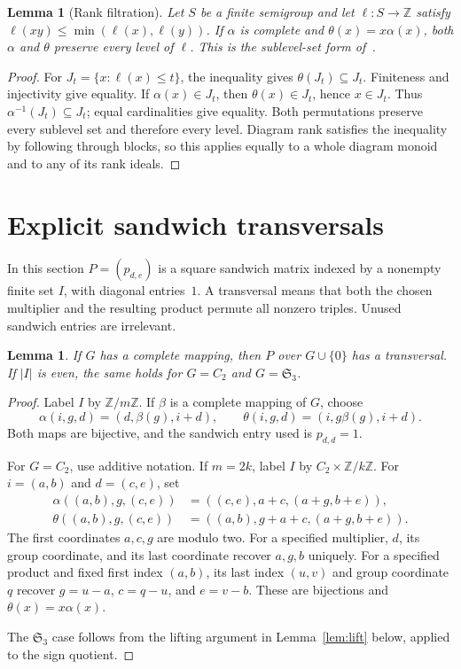\documentclass[11pt,a4paper]{article}
\newtheorem{lemma}[theorem]{Lemma}
\newcommand{\Sym}{\mathfrak S}
\newcommand{\Z}{\mathbb Z}
\begin{document}
\begin{lemma}[Rank filtration]\label{lem:filtration}
Let $S$ be a finite semigroup and let $\ell:S\to\mathbb Z$ satisfy $\ell(xy)\le\min(\ell(x),\ell(y))$. If $\alpha$ is complete and $\theta(x)=x\alpha(x)$, both $\alpha$ and $\theta$ preserve every level of $\ell$. This is the sublevel-set form of~\cite[Proposition~3.1]{ABCHK}.
\end{lemma}
\begin{proof}
For $J_t=\{x:\ell(x)\le t\}$, the inequality gives $\theta(J_t)\subseteq J_t$. Finiteness and injectivity give equality. If $\alpha(x)\in J_t$, then $\theta(x)\in J_t$, hence $x\in J_t$. Thus $\alpha^{-1}(J_t)\subseteq J_t$; equal cardinalities give equality. Both permutations preserve every sublevel set and therefore every level. Diagram rank satisfies the inequality by following through blocks, so this applies equally to a whole diagram monoid and to any of its rank ideals.
\end{proof}

\section{Explicit sandwich transversals}\label{sec:transversals}
In this section $P=(p_{d,e})$ is a square sandwich matrix indexed by a nonempty finite set $I$, with diagonal entries~$1$. A transversal means that both the chosen multiplier and the resulting product permute all nonzero triples. Unused sandwich entries are irrelevant.

\begin{lemma}\label{lem:good-even}
If $G$ has a complete mapping, then $P$ over $G\cup\{0\}$ has a transversal. If $|I|$ is even, the same holds for $G=C_2$ and $G=\Sym_3$.
\end{lemma}
\begin{proof}
Label $I$ by $\Z/m\Z$. If $\beta$ is a complete mapping of $G$, choose
\[
 \alpha(i,g,d)=(d,\beta(g),i+d),\qquad
 \theta(i,g,d)=(i,g\beta(g),i+d).
\]
Both maps are bijective, and the sandwich entry used is $p_{d,d}=1$.

For $G=C_2$, use additive notation. If $m=2k$, label $I$ by $C_2\times\Z/k\Z$. For $i=(a,b)$ and $d=(c,e)$, set
\begin{align*}
 \alpha((a,b),g,(c,e))&=((c,e),a+c,(a+g,b+e)),\\
 \theta((a,b),g,(c,e))&=((a,b),g+a+c,(a+g,b+e)).
\end{align*}
The first coordinates $a,c,g$ are modulo two. For a specified multiplier, $d$, its group coordinate, and its last coordinate recover $a,g,b$ uniquely. For a specified product and fixed first index $(a,b)$, its last index $(u,v)$ and group coordinate $q$ recover $g=u-a$, $c=q-u$, and $e=v-b$. These are bijections and $\theta(x)=x\alpha(x)$.

The $\Sym_3$ case follows from the lifting argument in Lemma~\ref{lem:lift} below, applied to the sign quotient.
\end{proof}
\end{document}
